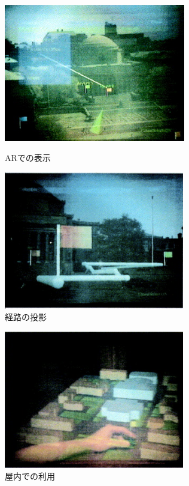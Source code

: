 \begin{figure}[h]
  \begin{minipage}{0.5\hsize}
    \centering 
    \includegraphics[height=60mm]{images/mars_ar.png}
    \caption{ARでの表示} \label{fig:mars_ar}
  \end{minipage}
  \begin{minipage}{0.5\hsize}
    \centering 
    \includegraphics[height=60mm]{images/mars_route.png}
    \caption{経路の投影} \label{fig:mars_route}
  \end{minipage}
\end{figure}


\begin{figure}[h]
  \centering
  \includegraphics[height=60mm]{images/mars_ar_indoor.png}
  \caption{屋内での利用} \label{fig:mars_ar_indoor}
\end{figure}

